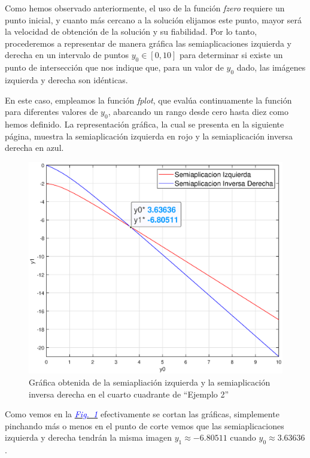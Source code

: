 \documentclass[12pt,a4paper]{report} %
\newcommand{\fref}[1]{\hyperref[#1]{\textcolor{blue}{\textit{Fig.~\ref*{#1}}}}}
\begin{document}
	Como hemos observado anteriormente, el uso de la función \textit{fzero} requiere un punto inicial, y cuanto más cercano a la solución elijamos este punto, mayor será la velocidad de obtención de la solución y su fiabilidad. Por lo tanto, procederemos a representar de manera gráfica las semiaplicaciones izquierda y derecha en un intervalo de puntos $y_0 \in [0, 10]$ para determinar si existe un punto de intersección que nos indique que, para un valor de $y_0$ dado, las imágenes izquierda y derecha son idénticas.
	
	\vspace{1cm}
	
	\vspace{1cm}En este caso, empleamos la función \textit{fplot}, que evalúa continuamente la función para diferentes valores de $y_0$, abarcando un rango desde cero hasta diez como hemos definido. La representación gráfica, la cual se presenta en la siguiente página, muestra la semiaplicación izquierda en rojo y la semiaplicación inversa derecha en azul.
	\newpage
	
	\begin{figure}[h]
		\centering
		\includegraphics[width=1\textwidth]{g1ejem2.eps}
		\caption{Gráfica obtenida de la semiapliación izquierda y la semiaplicación inversa derecha en el cuarto cuadrante de ``Ejemplo 2''}
		\label{fig:ejem2_2}
	\end{figure}\smallskip
	
	Como vemos en la \fref{fig:ejem2_2} efectivamente se cortan las gráficas, simplemente pinchando más o menos en el punto de corte vemos que las semiaplicaciones izquierda y derecha tendrán la misma imagen $y_1\approx-6.80511$ cuando $y_0\approx3.63636$.
	\newpage
	
\end{document}
